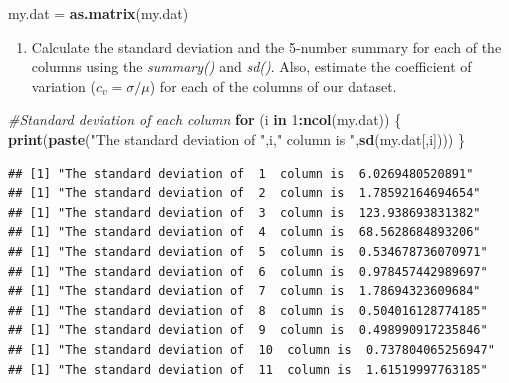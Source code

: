 \documentclass[
]{article}
\newenvironment{Shaded}{\begin{snugshade}}{\end{snugshade}}
\newcommand{\CommentTok}[1]{\textcolor[rgb]{0.56,0.35,0.01}{\textit{#1}}}
\newcommand{\ControlFlowTok}[1]{\textcolor[rgb]{0.13,0.29,0.53}{\textbf{#1}}}
\newcommand{\DecValTok}[1]{\textcolor[rgb]{0.00,0.00,0.81}{#1}}
\newcommand{\KeywordTok}[1]{\textcolor[rgb]{0.13,0.29,0.53}{\textbf{#1}}}
\newcommand{\NormalTok}[1]{#1}
\newcommand{\OperatorTok}[1]{\textcolor[rgb]{0.81,0.36,0.00}{\textbf{#1}}}
\newcommand{\StringTok}[1]{\textcolor[rgb]{0.31,0.60,0.02}{#1}}
\providecommand{\tightlist}{%
  \setlength{\itemsep}{0pt}\setlength{\parskip}{0pt}}
\begin{document}
\begin{Shaded}
\begin{Highlighting}[]
\NormalTok{my.dat =}\StringTok{ }\KeywordTok{as.matrix}\NormalTok{(my.dat)}
\end{Highlighting}
\end{Shaded}

\begin{enumerate}
\def\labelenumi{\arabic{enumi}.}
\setcounter{enumi}{1}
\tightlist
\item
  Calculate the standard deviation and the 5-number summary for each of
  the columns using the \emph{summary()} and \emph{sd()}. Also, estimate
  the coefficient of variation (\(c_v = \sigma / \mu\)) for each of the
  columns of our dataset.
\end{enumerate}

\begin{Shaded}
\begin{Highlighting}[]
\CommentTok{#Standard deviation of each column}
\ControlFlowTok{for}\NormalTok{ (i }\ControlFlowTok{in} \DecValTok{1}\OperatorTok{:}\KeywordTok{ncol}\NormalTok{(my.dat)) \{}
  \KeywordTok{print}\NormalTok{(}\KeywordTok{paste}\NormalTok{(}\StringTok{"The standard deviation of "}\NormalTok{,i,}\StringTok{" column is "}\NormalTok{,}\KeywordTok{sd}\NormalTok{(my.dat[,i])))}
\NormalTok{\}}
\end{Highlighting}
\end{Shaded}

\begin{verbatim}
## [1] "The standard deviation of  1  column is  6.0269480520891"
## [1] "The standard deviation of  2  column is  1.78592164694654"
## [1] "The standard deviation of  3  column is  123.938693831382"
## [1] "The standard deviation of  4  column is  68.5628684893206"
## [1] "The standard deviation of  5  column is  0.534678736070971"
## [1] "The standard deviation of  6  column is  0.978457442989697"
## [1] "The standard deviation of  7  column is  1.78694323609684"
## [1] "The standard deviation of  8  column is  0.504016128774185"
## [1] "The standard deviation of  9  column is  0.498990917235846"
## [1] "The standard deviation of  10  column is  0.737804065256947"
## [1] "The standard deviation of  11  column is  1.61519997763185"
\end{verbatim}

\begin{Shaded}
\end{Shaded}
\end{document}
